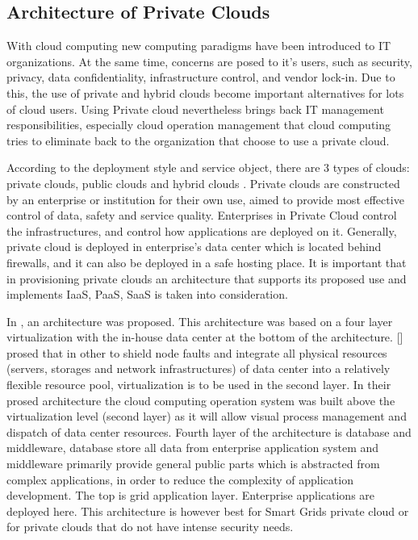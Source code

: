\subsection{Architecture of Private Clouds} \label{subsection:arch._of_Private_Private_Cloud}
With cloud computing new computing paradigms have been introduced to IT organizations. At the same time, concerns are posed to it's users, such as security, privacy, data confidentiality, infrastructure control, and vendor lock-in. Due to this, the use of private and hybrid clouds become important alternatives for lots of cloud users. Using Private cloud nevertheless brings back IT management responsibilities, especially cloud operation management that cloud computing tries to eliminate \cite{doelitzscher2011private} back to the organization that choose to use a private cloud.

According to the deployment style and service object, there are 3 types of clouds: private clouds, public clouds and hybrid clouds \cite{tanwer2010thin}. Private clouds are constructed by an enterprise or institution for their own use, aimed to provide most effective control of data, safety and service quality. Enterprises in Private Cloud control the infrastructures, and control how applications are deployed on it. Generally, private cloud is deployed in enterprise's data center which is located behind firewalls, and it can also be deployed in a safe hosting place. It is important that in provisioning private clouds an architecture that supports its proposed use and implements IaaS, PaaS, SaaS is taken into consideration.

In \cite{zheng2011design}, an architecture was proposed. This architecture was based on a four layer virtualization \cite{bouali2016virtualization} with the in-house data center at the bottom of the architecture. \citeauthor{zheng2011design} [\citeyear{zheng2011design}] prosed that in other to shield node faults and integrate all physical resources (servers, storages and network infrastructures) of data center into a relatively flexible resource pool, virtualization is to be used in the second layer. In their prosed architecture the cloud computing operation system was built above the virtualization level (second layer) as it will allow visual process management and dispatch of data center resources. Fourth layer of the architecture is database and middleware, database store all data from enterprise application system and middleware primarily provide general public parts which is abstracted from complex applications, in order to reduce the complexity of application development. The top is grid application layer. Enterprise applications are deployed here. This architecture is however best for Smart Grids private cloud or for private clouds that do not have intense security needs.

